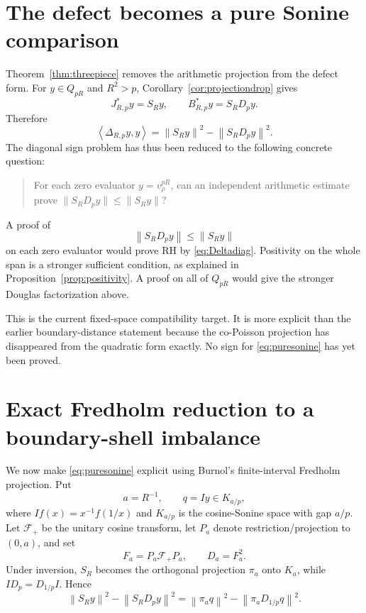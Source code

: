 \documentclass[11pt]{article}
\theoremstyle{remark}
\newcommand{\norm}[1]{\left\lVert #1\right\rVert}
\newcommand{\ip}[2]{\left\langle #1,#2\right\rangle}
\begin{document}
\section{The defect becomes a pure Sonine comparison}
Theorem~\ref{thm:threepiece} removes the arithmetic projection from the defect form. For $y\in Q_{pR}$ and $R^2>p$, Corollary~\ref{cor:projectiondrop} gives
\[
 J_{R,p}^*y=S_Ry,
 \qquad
 B_{R,p}^*y=S_RD_py.
\]
Therefore
\begin{equation}\label{eq:puresonine}
 \ip{\Delta_{R,p}y}{y}
 =\norm{S_Ry}^2-\norm{S_RD_py}^2.
\end{equation}
The diagonal sign problem has thus been reduced to the following concrete question:
\begin{quote}
For each zero evaluator $y=v_\rho^{pR}$, can an independent arithmetic estimate prove $\|S_RD_py\|\le\|S_Ry\|$?
\end{quote}
A proof of
\[
 \norm{S_RD_py}\le\norm{S_Ry}
\]
on each zero evaluator would prove RH by \eqref{eq:Deltadiag}. Positivity on the whole span is a stronger sufficient condition, as explained in Proposition~\ref{prop:positivity}. A proof on all of $Q_{pR}$ would give the stronger Douglas factorization above.

This is the current fixed-space compatibility target. It is more explicit than the earlier boundary-distance statement because the co-Poisson projection has disappeared from the quadratic form exactly. No sign for \eqref{eq:puresonine} has yet been proved.


\section{Exact Fredholm reduction to a boundary-shell imbalance}
We now make \eqref{eq:puresonine} explicit using Burnol's finite-interval Fredholm projection. Put
\[
 a=R^{-1},\qquad q=Iy\in K_{a/p},
\]
where $I f(x)=x^{-1}f(1/x)$ and $K_{a/p}$ is the cosine-Sonine space with gap $a/p$. Let $\mathcal F_+$ be the unitary cosine transform, let $P_a$ denote restriction/projection to $(0,a)$, and set
\[
 F_a=P_a\mathcal F_+P_a,\qquad D_a=F_a^2.
\]
Under inversion, $S_R$ becomes the orthogonal projection $\pi_a$ onto $K_a$, while $ID_p=D_{1/p}I$. Hence
\begin{equation}\label{eq:fredholm-start}
 \norm{S_Ry}^2-\norm{S_RD_py}^2
 =\norm{\pi_a q}^2-\norm{\pi_aD_{1/p}q}^2.
\end{equation}
\end{document}
